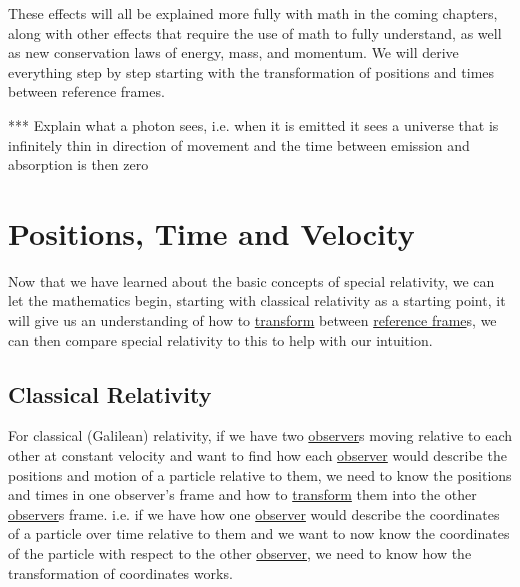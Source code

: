 These effects will all be explained more fully with math in the coming chapters, along with other effects that require the use of math to fully understand, as well as new conservation laws of energy, mass, and momentum. We will derive everything step by step starting with the transformation of positions and times between reference frames.

*** Explain what a photon sees, i.e. when it is emitted it sees a universe that is infinitely thin in direction of movement and the time between emission and absorption is then zero



\chapter{Positions, Time and Velocity} %

Now that we have learned about the basic concepts of special relativity, we can let the mathematics begin, starting with classical relativity as a starting point, it will give us an understanding of how to \hyperlink{def-transform}{transform} between \hyperlink{def-Reference-frame}{reference frame}s, we can then compare special relativity to this to help with our intuition.

\section{Classical Relativity}

For classical (Galilean) relativity, if we have two \hyperlink{def-observer}{observer}s moving relative to each other at constant velocity and want to find how each \hyperlink{def-observer}{observer} would describe the positions and motion of a particle relative to them, we need to know the positions and times in one observer's frame and how to \hyperlink{def-transform}{transform} them into the other \hyperlink{def-observer}{observer}s frame. i.e. if we have how one \hyperlink{def-observer}{observer} would describe the coordinates of a particle over time relative to them and we want to now know the coordinates of the particle with respect to the other \hyperlink{def-observer}{observer}, we need to know how the transformation of coordinates works.

